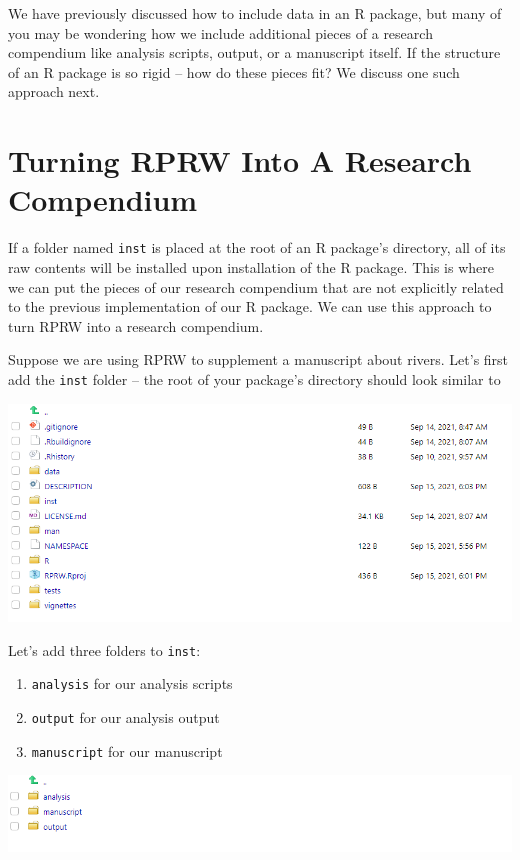 \documentclass[
]{book}
\providecommand{\tightlist}{%
  \setlength{\itemsep}{0pt}\setlength{\parskip}{0pt}}
\begin{document}
We have previously discussed how to include data in an R package, but many of you may be wondering how we include additional pieces of a research compendium like analysis scripts, output, or a manuscript itself. If the structure of an R package is so rigid -- how do these pieces fit? We discuss one such approach next.

\hypertarget{rprw-to-rc}{%
\section{Turning RPRW Into A Research Compendium}\label{rprw-to-rc}}

If a folder named \texttt{inst} is placed at the root of an R package's directory, all of its raw contents will be installed upon installation of the R package. This is where we can put the pieces of our research compendium that are not explicitly related to the previous implementation of our R package. We can use this approach to turn RPRW into a research compendium.

Suppose we are using RPRW to supplement a manuscript about rivers. Let's first add the \texttt{inst} folder -- the root of your package's directory should look similar to

\includegraphics[width=1\linewidth]{images/newrpack_files9}

Let's add three folders to \texttt{inst}:

\begin{enumerate}
\def\labelenumi{\arabic{enumi}.}
\tightlist
\item
  \texttt{analysis} for our analysis scripts
\item
  \texttt{output} for our analysis output
\item
  \texttt{manuscript} for our manuscript
\end{enumerate}

\includegraphics[width=1\linewidth]{images/newrpack_files10}
\end{document}
